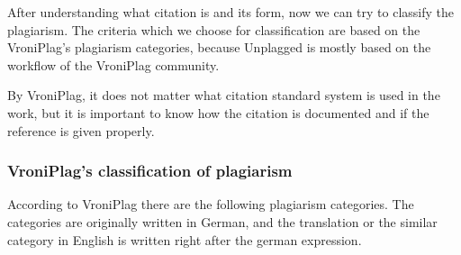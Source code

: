 After understanding what citation is and its form, now we can try to classify the plagiarism. The criteria which we 
choose for classification are based on the VroniPlag’s plagiarism categories, because Unplagged is mostly based 
on the workflow of the VroniPlag community. 

By VroniPlag, it does not matter what citation standard system is used in the work, but it is important to know how the 
citation is documented and if the reference is given properly.

\subsubsection{VroniPlag’s classification of plagiarism}\label{sec:classification}

According to VroniPlag there are the following plagiarism categories. 
The categories are originally written in German, and the translation or the similar category in English is written 
right after the german expression.

